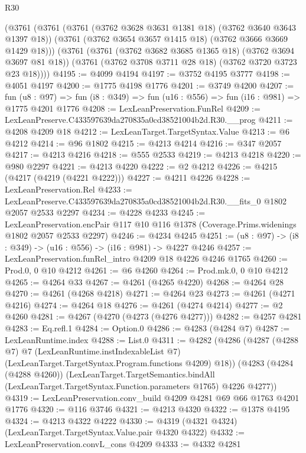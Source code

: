 \begin{lexlean}{R30}
\begin{coremodule}
    (@3761
      (@3761
        (@3761 (@3762 @3628 @3631 @1381 @18) (@3762 @3640 @3643 @1397 @18))
        (@3761 (@3762 @3654 @3657 @1415 @18) (@3762 @3666 @3669 @1429 @18)))
      (@3761
        (@3761 (@3762 @3682 @3685 @1365 @18) (@3762 @3694 @3697 @81 @18))
        (@3761 (@3762 @3708 @3711 @28 @18) (@3762 @3720 @3723 @23 @18))))
@4195 := @4099 @4194
@4197 := @3752 @4195 @3777
@4198 := @4051 @4197
@4200 := @1775 @4198 @1776
@4201 := @3749 @4200
@4207 := fun (u8 : @97) =>
  fun (i8 : @349) => fun (u16 : @556) => fun (i16 : @981) => @1775 @4201 @1776
@4208 := LexLeanPreservation.FunRel
@4209 := LexLeanPreserve.C433597639da270835a0cd38521004b2d.R30.__prog
@4211 := @4208 @4209 @18
@4212 := LexLeanTarget.TargetSyntax.Value
@4213 := @6 @4212
@4214 := @96 @1802
@4215 := @4213 @4214
@4216 := @347 @2057
@4217 := @4213 @4216
@4218 := @555 @2533
@4219 := @4213 @4218
@4220 := @980 @2297
@4221 := @4213 @4220
@4222 := @2 @4212
@4226 := @4215 (@4217 (@4219 (@4221 @4222)))
@4227 := @4211 @4226
@4228 := LexLeanPreservation.Rel
@4233 := LexLeanPreserve.C433597639da270835a0cd38521004b2d.R30.__fits_0 @1802 @2057 @2533 @2297
@4234 := @4228 @4233
@4245 := LexLeanPreservation.encPair
    @117
    @10
    @116
    @1378
    (Coverage.Prims.widenings @1802 @2057 @2533 @2297)
@4246 := @4234 @4245
@4251 := (u8 : @97) -> (i8 : @349) -> (u16 : @556) -> (i16 : @981) -> @4227 @4246
@4257 := LexLeanPreservation.funRel_intro @4209 @18 @4226 @4246 @1765
@4260 := Prod.{0, 0} @10 @4212
@4261 := @6 @4260
@4264 := Prod.mk.{0, 0} @10 @4212
@4265 := @4264 @33
@4267 := @4261 (@4265 @4220)
@4268 := @4264 @28
@4270 := @4261 (@4268 @4218)
@4271 := @4264 @23
@4273 := @4261 (@4271 @4216)
@4274 := @4264 @18
@4276 := @4261 (@4274 @4214)
@4277 := @2 @4260
@4281 := @4267 (@4270 (@4273 (@4276 @4277)))
@4282 := @4257 @4281
@4283 := Eq.refl.{1}
@4284 := Option.{0}
@4286 := @4283 (@4284 @7)
@4287 := LexLeanRuntime.index
@4288 := List.{0}
@4311 := @4282
    (@4286
      (@4287
        (@4288 @7)
        @7
        (LexLeanRuntime.instIndexableList @7)
        (LexLeanTarget.TargetSyntax.Program.functions @4209)
        @18))
    (@4283
      (@4284 (@4288 @4260))
      (LexLeanTarget.TargetSemantics.bindAll
        (LexLeanTarget.TargetSyntax.Function.parameters @1765)
        @4226
        @4277))
@4319 := LexLeanPreservation.conv_build @4209 @4281 @69 @66 @1763 @4201 @1776
@4320 := @116 @3746
@4321 := @4213 @4320
@4322 := @1378 @4195
@4324 := @4213 @4322 @4222
@4330 := @4319 (@4321 @4324) (LexLeanTarget.TargetSyntax.Value.pair @4320 @4322)
@4332 := LexLeanPreservation.convL_cons @4209
@4333 := @4332 @4281

\end{coremodule}
\end{lexlean}
